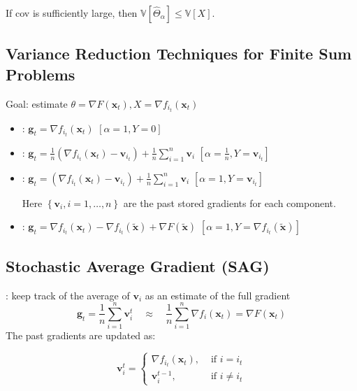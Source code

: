 If cov is sufficiently large, then $\mathbb{V}\left[\hat{\Theta}_{\alpha}\right] \leq \mathbb{V}[X]$.







\subsection*{Variance Reduction Techniques for Finite Sum Problems}
Goal: estimate $\theta=\nabla F\left(\mathbf{x}_{t}\right), X=\nabla f_{i_{t}}\left(\mathbf{x}_{t}\right)$
\begin{itemize}[leftmargin=*]
    \item {}: $\mathbf{g}_{t}=\nabla f_{i_{t}}\left(\mathbf{x}_{t}\right)$
$[\alpha=1, Y=0]$
    \item {}: $\mathbf{g}_{t}=\frac{1}{n}\left(\nabla f_{i_{t}}\left(\mathbf{x}_{t}\right)-\mathbf{v}_{i_{t}}\right)+\frac{1}{n} \sum_{i=1}^{n} \mathbf{v}_{i}$
$\left[\alpha=\frac{1}{n}, Y=\mathbf{v}_{i_{t}}\right]$
    \item {}: $\mathbf{g}_{t}=\left(\nabla f_{i_{t}}\left(\mathbf{x}_{t}\right)-\mathbf{v}_{i_{t}}\right)+\frac{1}{n} \sum_{i=1}^{n} \mathbf{v}_{i}$
$\left[\alpha=1, Y=\mathbf{v}_{i_{t}}\right]$

Here $\left\{\mathbf{v}_{i}, i=1, \ldots, n\right\}$ are the past stored gradients for each component.
    \item {}: $\mathbf{g}_{t}=\nabla f_{i_{t}}\left(\mathbf{x}_{t}\right)-\nabla f_{i_{t}}(\tilde{\mathbf{x}})+\nabla F(\tilde{\mathbf{x}})$
$\left[\alpha=1, Y=\nabla f_{i_{t}}(\tilde{\mathbf{x}})\right]$
\end{itemize}







\subsection*{Stochastic Average Gradient (SAG)}
: keep track of the average of $\mathbf{v}_{i}$ as an estimate of the full gradient
$$
\mathbf{g}_{t}=\frac{1}{n} \sum_{i=1}^{n} \mathbf{v}_{i}^{t} \quad \approx \quad \frac{1}{n} \sum_{i=1}^{n} \nabla f_{i}\left(\mathbf{x}_{t}\right)=\nabla F\left(\mathbf{x}_{t}\right)
$$
The past gradients are updated as:

$$
\mathbf{v}_{i}^{t}= \begin{cases}\nabla f_{i_{t}}\left(\mathbf{x}_{t}\right), & \text { if } i=i_{t} \\ \mathbf{v}_{i}^{t-1}, & \text { if } i \neq i_{t}\end{cases}
$$

